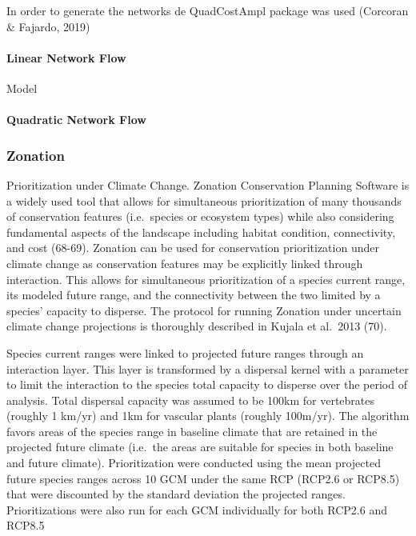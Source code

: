 \documentclass[]{article}
\let\oldparagraph\paragraph
\renewcommand{\paragraph}[1]{\oldparagraph{#1}\mbox{}}
\begin{document}
In order to generate the networks de QuadCostAmpl package was used (Corcoran \& Fajardo, 2019)

\hypertarget{linear-network-flow}{%
\paragraph{Linear Network Flow}\label{linear-network-flow}}

Model

\hypertarget{quadratic-network-flow}{%
\paragraph{Quadratic Network Flow}\label{quadratic-network-flow}}

\hypertarget{zonation}{%
\subsubsection{Zonation}\label{zonation}}

Prioritization under Climate Change. Zonation Conservation Planning Software is a widely used tool that allows for simultaneous prioritization of many thousands of conservation features (i.e.~species or ecosystem types) while also considering fundamental aspects of the landscape including habitat condition, connectivity, and cost (68-69). Zonation can be used for conservation prioritization under climate change as conservation features may be explicitly linked through interaction. This allows for simultaneous prioritization of a species current range, its modeled future range, and the connectivity between the two limited by a species' capacity to disperse. The protocol for running Zonation under uncertain climate change projections is thoroughly described in Kujala et al.~2013 (70).

Species current ranges were linked to projected future ranges through an interaction layer. This layer is transformed by a dispersal kernel with a parameter to limit the interaction to the species total capacity to disperse over the period of analysis. Total dispersal capacity was assumed to be 100km for vertebrates (roughly 1 km/yr) and 1km for vascular plants (roughly 100m/yr). The algorithm favors areas of the species range in baseline climate that are retained in the projected future climate (i.e.~the areas are suitable for species in both baseline and future climate). Prioritization were conducted using the mean projected future species ranges across 10 GCM under the same RCP (RCP2.6 or RCP8.5) that were discounted by the standard deviation the projected ranges. Prioritizations were also run for each GCM individually for both RCP2.6 and RCP8.5
\end{document}
